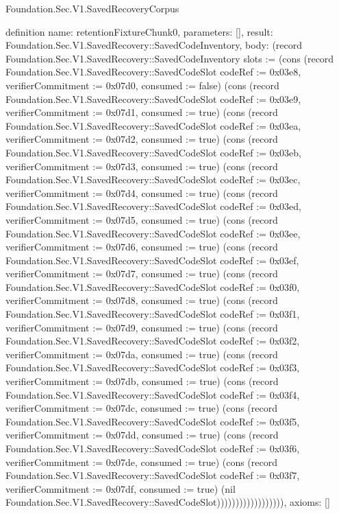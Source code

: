 \begin{lexlean}{Foundation.Sec.V1.SavedRecoveryCorpus}
\begin{semanticmodule}
definition{
  name: retentionFixtureChunk0,
  parameters: [],
  result: Foundation.Sec.V1.SavedRecovery::SavedCodeInventory,
  body: (record Foundation.Sec.V1.SavedRecovery::SavedCodeInventory {slots := (cons (record Foundation.Sec.V1.SavedRecovery::SavedCodeSlot {codeRef := 0x03e8, verifierCommitment := 0x07d0, consumed := false}) (cons (record Foundation.Sec.V1.SavedRecovery::SavedCodeSlot {codeRef := 0x03e9, verifierCommitment := 0x07d1, consumed := true}) (cons (record Foundation.Sec.V1.SavedRecovery::SavedCodeSlot {codeRef := 0x03ea, verifierCommitment := 0x07d2, consumed := true}) (cons (record Foundation.Sec.V1.SavedRecovery::SavedCodeSlot {codeRef := 0x03eb, verifierCommitment := 0x07d3, consumed := true}) (cons (record Foundation.Sec.V1.SavedRecovery::SavedCodeSlot {codeRef := 0x03ec, verifierCommitment := 0x07d4, consumed := true}) (cons (record Foundation.Sec.V1.SavedRecovery::SavedCodeSlot {codeRef := 0x03ed, verifierCommitment := 0x07d5, consumed := true}) (cons (record Foundation.Sec.V1.SavedRecovery::SavedCodeSlot {codeRef := 0x03ee, verifierCommitment := 0x07d6, consumed := true}) (cons (record Foundation.Sec.V1.SavedRecovery::SavedCodeSlot {codeRef := 0x03ef, verifierCommitment := 0x07d7, consumed := true}) (cons (record Foundation.Sec.V1.SavedRecovery::SavedCodeSlot {codeRef := 0x03f0, verifierCommitment := 0x07d8, consumed := true}) (cons (record Foundation.Sec.V1.SavedRecovery::SavedCodeSlot {codeRef := 0x03f1, verifierCommitment := 0x07d9, consumed := true}) (cons (record Foundation.Sec.V1.SavedRecovery::SavedCodeSlot {codeRef := 0x03f2, verifierCommitment := 0x07da, consumed := true}) (cons (record Foundation.Sec.V1.SavedRecovery::SavedCodeSlot {codeRef := 0x03f3, verifierCommitment := 0x07db, consumed := true}) (cons (record Foundation.Sec.V1.SavedRecovery::SavedCodeSlot {codeRef := 0x03f4, verifierCommitment := 0x07dc, consumed := true}) (cons (record Foundation.Sec.V1.SavedRecovery::SavedCodeSlot {codeRef := 0x03f5, verifierCommitment := 0x07dd, consumed := true}) (cons (record Foundation.Sec.V1.SavedRecovery::SavedCodeSlot {codeRef := 0x03f6, verifierCommitment := 0x07de, consumed := true}) (cons (record Foundation.Sec.V1.SavedRecovery::SavedCodeSlot {codeRef := 0x03f7, verifierCommitment := 0x07df, consumed := true}) (nil Foundation.Sec.V1.SavedRecovery::SavedCodeSlot)))))))))))))))))}),
  axioms: []
}


\end{semanticmodule}
\end{lexlean}
